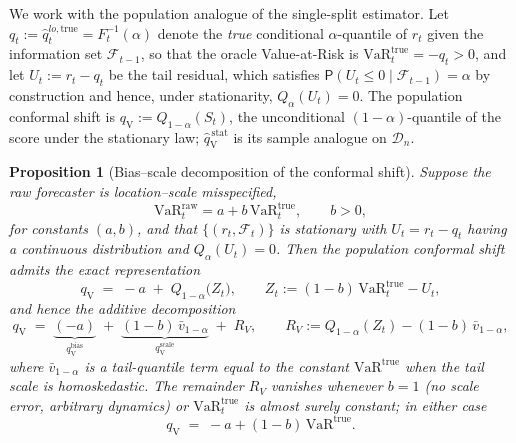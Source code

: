 \documentclass[11pt]{article}
\newtheorem{proposition}[theorem]{Proposition}
\newcommand{\VaR}{\mathrm{VaR}}
\renewcommand{\P}{\mathsf{P}}
\newcommand{\1}{\boldsymbol{1}}
\newcommand{\qVstat}{\hat{q}_{\scriptscriptstyle\mathrm{V}}^{\,\mathrm{stat}}}
\newcommand{\qV}{q_{\scriptscriptstyle\mathrm{V}}}          %
\begin{document}
We work with the population analogue of the single-split estimator. Let $q_t
:= \hat q_t^{lo,\mathrm{true}}=F_t^{-1}(\alpha)$ denote the \emph{true}
conditional $\alpha$-quantile of $r_t$ given the information set
$\mathcal F_{t-1}$, so that the oracle Value-at-Risk is
$\VaR_t^{\mathrm{true}}=-q_t>0$, and let
$U_t := r_t-q_t$ be the tail residual, which satisfies
$\P(U_t\le 0\mid\mathcal F_{t-1})=\alpha$ by construction and hence, under
stationarity, $Q_\alpha(U_t)=0$. The population conformal shift is
$\qV := Q_{1-\alpha}(S_t)$, the unconditional $(1-\alpha)$-quantile of the score
under the stationary law; $\qVstat$ is its sample analogue on $\mathcal D_n$.

\begin{proposition}[Bias--scale decomposition of the conformal shift]
\label{prop:decomposition}
Suppose the raw forecaster is location--scale misspecified,
\begin{equation}
\label{eq:rr_ls_model}
\VaR_t^{\mathrm{raw}} = a + b\,\VaR_t^{\mathrm{true}},
\qquad b>0,
\end{equation}
for constants $(a,b)$, and that $\{(r_t,\mathcal F_t)\}$ is stationary with
$U_t=r_t-q_t$ having a continuous distribution and $Q_\alpha(U_t)=0$. Then the
population conformal shift admits the exact representation
\begin{equation}
\label{eq:rr_qv_exact}
\qV \;=\; -a \;+\; Q_{1-\alpha}\!\big(Z_t\big),
\qquad
Z_t := (1-b)\,\VaR_t^{\mathrm{true}} - U_t ,
\end{equation}
and hence the additive decomposition
\begin{equation}
\label{eq:rr_decomp}
\qV
\;=\;
\underbrace{(-a)}_{\displaystyle \qV^{\mathrm{bias}}}
\;+\;
\underbrace{(1-b)\,\bar v_{1-\alpha}}_{\displaystyle \qV^{\mathrm{scale}}}
\;+\; R_V,
\qquad
R_V := Q_{1-\alpha}(Z_t)-(1-b)\,\bar v_{1-\alpha},
\end{equation}
where $\bar v_{1-\alpha}$ is a tail-quantile term equal to the constant
$\VaR^{\mathrm{true}}$ when the tail scale is homoskedastic. The remainder
$R_V$ vanishes whenever $b=1$ (no scale error, arbitrary dynamics) or
$\VaR_t^{\mathrm{true}}$ is almost surely constant; in either case
\begin{equation}
\label{eq:rr_decomp_exact}
\qV \;=\; -a + (1-b)\,\VaR^{\mathrm{true}} .
\end{equation}
\end{proposition}
\end{document}
